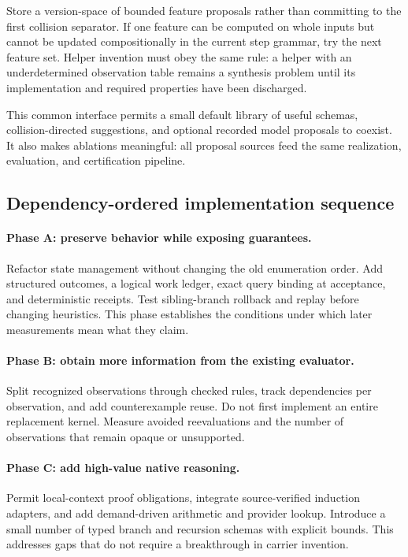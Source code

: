 \documentclass[11pt,a4paper]{article}
\theoremstyle{remark}
\begin{document}
Store a version-space of bounded feature proposals rather than committing
to the first collision separator. If one feature can be computed on whole
inputs but cannot be updated compositionally in the current step grammar,
try the next feature set. Helper invention must obey the same rule: a helper
with an underdetermined observation table remains a synthesis problem until
its implementation and required properties have been discharged.

This common interface permits a small default library of useful schemas,
collision-directed suggestions, and optional recorded model proposals to
coexist. It also makes ablations meaningful: all proposal sources feed the
same realization, evaluation, and certification pipeline.

\subsection{Dependency-ordered implementation sequence}

\paragraph{Phase A: preserve behavior while exposing guarantees.}
Refactor state management without changing the old enumeration order. Add
structured outcomes, a logical work ledger, exact query binding at acceptance,
and deterministic receipts. Test sibling-branch rollback and replay before
changing heuristics. This phase establishes the conditions under which later
measurements mean what they claim.

\paragraph{Phase B: obtain more information from the existing evaluator.}
Split recognized observations through checked rules, track dependencies per
observation, and add counterexample reuse. Do not first implement an entire
replacement kernel. Measure avoided reevaluations and the number of
observations that remain opaque or unsupported.

\paragraph{Phase C: add high-value native reasoning.}
Permit local-context proof obligations, integrate source-verified induction
adapters, and add demand-driven arithmetic and provider lookup. Introduce a
small number of typed branch and recursion schemas with explicit bounds.
This addresses gaps that do not require a breakthrough in carrier invention.
\end{document}
